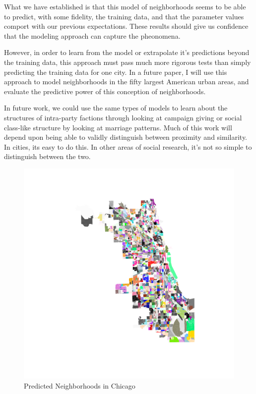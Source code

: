 \documentclass[12pt,letter]{article}\usepackage[]{graphicx}\usepackage[]{color}
\begin{document}
What we have established is that this model of neighborhoods seems to
be able to predict, with some fidelity, the training data, and that
the parameter values comport with our previous expectations. These
results should give us confidence that the modeling approach can
capture the pheonomena. 

However, in order to learn from the model or extrapolate it's
predictions beyond the training data, this approach must pass much
more rigorous tests than simply predicting the training data for one
city. In a future paper, I will use this approach to model
neighborhoods in the fifty largest American urban areas, and evaluate
the predictive power of this conception of neighborhoods. 

In future work, we could use the same types of models to learn about
the structures of intra-party factions through looking at campaign
giving or social class-like structure by looking at marriage
patterns. Much of this work will depend upon being able to validly
distinguish between proximity and similarity. In cities, its easy to
do this. In other areas of social research, it's not so simple to
distinguish between the two.





\begin{figure}
\includegraphics{../code/training/predicted_chicago_neighborhoods.pdf}
\caption{Predicted Neighborhoods in Chicago}
\end{figure}
\end{document}
